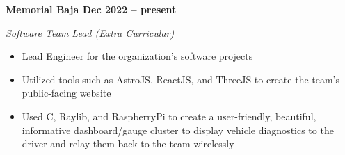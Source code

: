 \vspace{0.1cm}
\textbf{Memorial Baja \hfill Dec 2022 -- present} \par
\textit{Software Team Lead (Extra Curricular)} \par
\begin{itemize}
    \item Lead Engineer for the organization's software projects
    \item Utilized tools such as AstroJS, ReactJS, and ThreeJS to create the team's public-facing website
    \item Used C, Raylib, and RaspberryPi to create a user-friendly, beautiful, informative dashboard/gauge cluster to display vehicle diagnostics to the driver and relay them back to the team wirelessly 
\end{itemize} \par